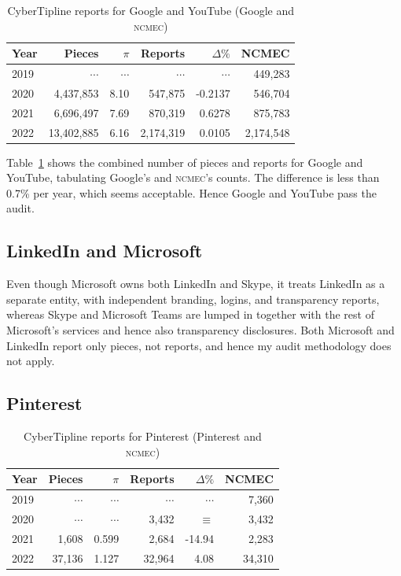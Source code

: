 \documentclass[nonacm,screen]{acmart}
\newcommand\V[1]{\textsc{\MakeLowercase{#1}}}
\begin{document}
\begin{table}[h!]
\centering\libertineLF
\caption{CyberTipline reports for Google and YouTube (Google and \V{NCMEC})}
\label{tab:alphabet}
\begin{tabular}{l|rr|rrr}
\textbf{Year}
& \textbf{Pieces} & \textbf{$\pi$} & \textbf{Reports}
& \textbf{$\Delta\%$} & \textbf{NCMEC} \\ \hline
2019 & $\cdots$ & $\cdots$ & $\cdots$ & $\cdots$ & 449,283 \\
2020 & 4,437,853 & 8.10 & 547,875 & -0.2137 & 546,704 \\
2021 & 6,696,497 & 7.69 & 870,319 & 0.6278 & 875,783 \\
2022 & 13,402,885 & 6.16 & 2,174,319 & 0.0105 & 2,174,548 \\
\end{tabular}
\end{table}

\noindent{}Table~\ref{tab:alphabet} shows the combined number of pieces and
reports for Google and YouTube, tabulating Google's and \V{NCMEC}'s counts. The
difference is less than 0.7\% per year, which seems acceptable. Hence Google and
YouTube pass the audit.


\subsection{LinkedIn and Microsoft}

\noindent{}Even though Microsoft owns both LinkedIn and Skype, it treats
LinkedIn as a separate entity, with independent branding, logins, and
transparency reports, whereas Skype and Microsoft Teams are lumped in together
with the rest of Microsoft's services and hence also transparency disclosures.
Both Microsoft and LinkedIn report only pieces, not reports, and hence my audit
methodology does not apply.


\subsection{Pinterest}

\begin{table}[h!]
\centering\libertineLF
\caption{CyberTipline reports for Pinterest (Pinterest and \V{NCMEC})}
\label{tab:pinterest}
\begin{tabular}{l|rr|rrr}
\textbf{Year}
& \textbf{Pieces} & \textbf{$\pi$} & \textbf{Reports}
& \textbf{$\Delta\%$} & \textbf{NCMEC} \\ \hline
2019 & $\cdots$ & $\cdots$ & $\cdots$ & $\cdots$ & 7,360 \\
2020 & $\cdots$ & $\cdots$ & 3,432 & $\equiv$ & 3,432 \\
2021 & 1,608 & 0.599 & 2,684 & -14.94 & 2,283 \\
2022 & 37,136 & 1.127 & 32,964 & 4.08 & 34,310 \\
\end{tabular}
\end{table}
\end{document}

